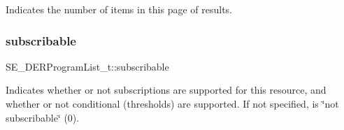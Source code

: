 Indicates the number of items in this page of results. \mbox{\label{group__DERProgramList_gac3b255db4914973bb3d51e1b104ca485}} 
\subsubsection{\texorpdfstring{subscribable}{subscribable}}
{\footnotesize\ttfamily S\+E\+\_\+\+D\+E\+R\+Program\+List\+\_\+t\+::subscribable}

Indicates whether or not subscriptions are supported for this resource, and whether or not conditional (thresholds) are supported. If not specified, is \char`\"{}not subscribable\char`\"{} (0). 